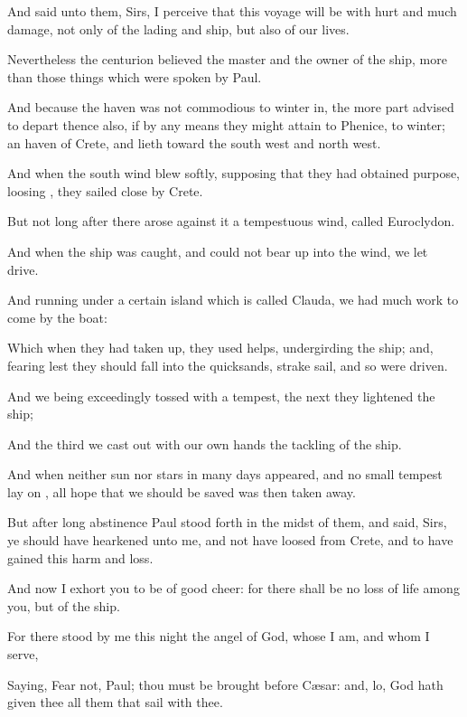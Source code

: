 {And
said unto
them,
Sirs, I
perceive
that this
voyage
will
be
with
hurt and
much
damage,
not
only of the
lading
and
ship,
but
also of
our
lives.

Nevertheless the
centurion
believed the
master
and the owner of the
ship,
more
than those
things which were
spoken
by
Paul.

And because the
haven
was not
commodious
to winter
in, the more
part
advised to
depart thence
also, if by any
means they
might
attain
to
Phenice,
{} to
winter;
{} an
haven of
Crete, and
lieth
toward the south
west
and north
west.

And when the south
wind blew
softly, supposing
that they had
obtained
{}
purpose,
loosing
{}, they
sailed
close by
Crete.

But
not
long
after there
arose
against
it a
tempestuous
wind,
called
Euroclydon.

And when the
ship was
caught,
and
could
not bear up
into the
wind, we
let
{}
drive.

And running
under a
certain
island which is
called
Clauda, we had
much
work to
come
by the
boat:

Which when they had taken
up, they
used
helps,
undergirding the
ship;
and,
fearing
lest they should
fall
into the
quicksands,
strake
sail, and
so were
driven.

And
we being
exceedingly tossed with a
tempest, the
next
{} they
lightened the
ship;

And the
third
{} we cast
out with our own
hands the
tackling of the
ship.

And when
neither
sun
nor
stars
in
many
days
appeared,
and
no
small
tempest lay
on
{},
all
hope that
we should be
saved
was
then taken
away.

But
after
long
abstinence
Paul stood
forth
in the
midst of
them, and
said,
Sirs, ye
should have
hearkened unto
me,
and
not have
loosed
from
Crete,
and to have
gained
this
harm
and
loss.

And
now I
exhort
you to be of good
cheer:
for there shall
be
no loss
of
{}
life
among
you,
but of the
ship.

For there
stood by
me
this
night the
angel of
God,
whose I
am,
and
whom I
serve,

Saying,
Fear
not,
Paul;
thou must
be brought
before
Cæsar:
and,
lo,
God hath
given
thee
all
them that
sail
with
thee.

}
